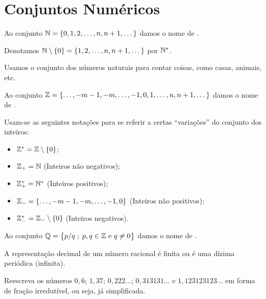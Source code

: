 \section{Conjuntos Numéricos}

\begin{definition}
Ao conjunto $\mathbb{N} = \left\{ 0, 1, 2, \dots , n, n+1, \dots\right\}$ damos o nome de .
\end{definition}

\begin{remark}
Denotamos $\mathbb{N} \setminus \left\{ 0\right\} = \left\{ 1, 2, \dots , n, n+1, \dots\right\}$ por $\mathbb{N} ^\ast$.
\end{remark}

\noindent Usamos o conjunto dos números naturais para contar coisas, como casas, animais, etc.

\begin{definition}
Ao conjunto $\mathbb{Z} =\left\{ \dots , -m -1, -m, \dots, -1, 0, 1,  \dots , n, n+1, \dots\right\}$ damos o nome de . 
\end{definition}

\noindent Usam-se as seguintes notações para se referir a certas ``variações'' do conjunto dos inteiros:

\begin{itemize}
	\item $\mathbb{Z}^\ast = \mathbb{Z} \setminus \left\{ 0\right\}$; 
	\item $\mathbb{Z}_+ = \mathbb{N}$ (Inteiros não negativos); 
	\item $\mathbb{Z}^\ast_+ =\mathbb{N} ^\ast$ (Inteiros positivos); 
	\item $\mathbb{Z}_- =\left\{ \dots , -m -1, -m, \dots, -1, 0\right\}$ (Inteiros não positivos); 
	\item $\mathbb{Z}_-^\ast =\mathbb{Z}_- \setminus \left\{ 0\right\}$ (Inteiros negativos).
\end{itemize}

\begin{definition}
Ao conjunto $\mathbb{Q} = \left\{ p/q \;;\; p, q \in \mathbb{Z} \text{ e } q \neq 0\right\}$ damos o nome de .
\end{definition}

\begin{remark}
A representação decimal de um número racional é finita ou é uma dízima periódica (infinita).
\end{remark}

\begin{exercise}
Reescreva os números $0{,}6$; $1{,}37$; $0{,}222\dots$; $0{,}313131 \dots$ e $1{,}123123123 \dots$ em forma de fração irredutível, ou seja, já simplificada.
\end{exercise}

